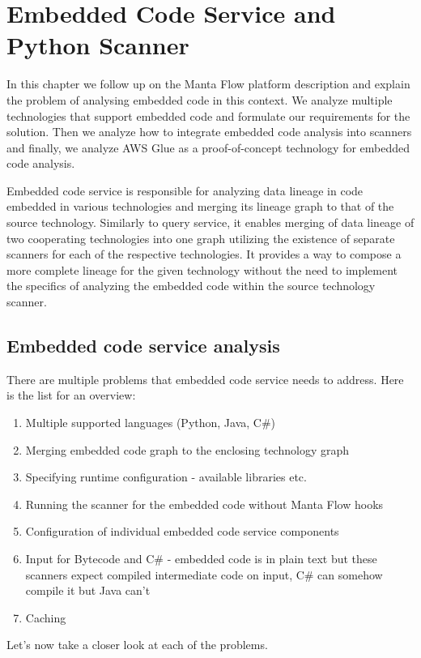 \chapter{Embedded Code Service and Python Scanner}

In this chapter we follow up on the Manta Flow platform description and explain the problem of analysing embedded code in this context. We analyze multiple technologies that support embedded code and formulate our requirements for the solution. Then we analyze how to integrate embedded code analysis into scanners and finally, we analyze AWS Glue as a proof-of-concept technology for embedded code analysis.

Embedded code service is responsible for analyzing data lineage in code embedded in various technologies and merging its lineage graph to that of the source technology. Similarly to query service, it enables merging of data lineage of two cooperating technologies into one graph utilizing the existence of separate scanners for each of the respective technologies. It provides a way to compose a more complete lineage for the given technology without the need to implement the specifics of analyzing the embedded code within the source technology scanner.

\section{Embedded code service analysis}

There are multiple problems that embedded code service needs to address. Here is the list for an overview:
\begin{enumerate}
    \item Multiple supported languages (Python, Java, C\#)
    \item Merging embedded code graph to the enclosing technology graph
    \item Specifying runtime configuration - available libraries etc.
    \item Running the scanner for the embedded code without Manta Flow hooks
    \item Configuration of individual embedded code service components
    \item Input for Bytecode and C\# - embedded code is in plain text but these scanners expect compiled intermediate code on input, C\# can somehow compile it but Java can’t
    \item Caching
\end{enumerate}
Let’s now take a closer look at each of the problems.

